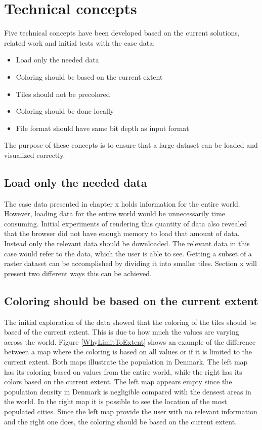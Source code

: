 
\chapter{Technical concepts}
Five technical concepts have been developed based on the current solutions, related work and initial tests with the case data:
\begin{itemize}
	\item Load only the needed data
	\item Coloring should be based on the current extent
	\item Tiles should not be precolored
	\item Coloring should be done locally
	\item File format should have same bit depth as input format
\end{itemize}

The purpose of these concepts is to ensure that a large dataset can be loaded and visualized correctly. 

\section{Load only the needed data}
The case data presented in chapter x holds information for the entire world. However, loading data for the entire world would be unnecessarily time consuming. Initial experiments of rendering this quantity of data also revealed that the browser did not have enough memory to load that amount of data. Instead only the relevant data should be downloaded. The relevant data in this case would refer to the data, which the user is able to see. Getting a subset of a raster dataset can be accomplished by dividing it into smaller tiles. Section x will present two different ways this can be achieved.

\section{Coloring should be based on the current extent}
The initial exploration of the data showed that the coloring of the tiles should be based of the current extent. This is due to how much the values are varying across the world. Figure \ref{WhyLimitToExtent} shows an example of the difference between a map where the coloring is based on all values or if it is limited to the current extent. Both maps illustrate the population in Denmark. The left map has its coloring based on values from the entire world, while the right has its colors based on the current extent. The left map appears empty since the population density in Denmark is negligible compared with the densest areas in the world. In the right map it is possible to see the location of the most populated cities. Since the left map provide the user with no relevant information and the right one does, the coloring should be based on the current extent.


